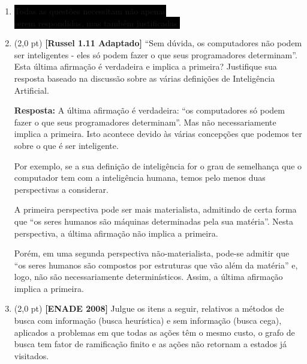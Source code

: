 \documentclass[12pt,a4paper,oneside]{article}
\begin{document}
\begin{enumerate}


	\item[] \colorbox{black}{
		\color{white}Todas as questões necessitam não apenas
	}\\ 
	\colorbox{black}{
		\color{white} serem respondidas, mas também justificadas.
	}

	\item (2,0 pt) {\bf [Russel 1.11 Adaptado]} ``Sem dúvida, os computadores não podem ser inteligentes - eles só podem fazer o que seus programadores determinam''. Esta última afirmação é verdadeira e implica a primeira? Justifique sua resposta baseado na discussão sobre as várias definições de Inteligência Artificial.
	
	\vspace*{0.3cm}
	
	{\color{blue} 
		{\bf Resposta:} A última afirmação é verdadeira: ``os computadores só podem fazer o que seus programadores determinam''. Mas não necessariamente implica a primeira. Isto acontece devido às várias concepções que podemos ter sobre o que é ser inteligente.
		
		Por exemplo, se a sua definição de inteligência for o grau de semelhança que o computador tem com a inteligência humana, temos pelo menos duas perspectivas a considerar. 
		
		A primeira perspectiva pode ser mais materialista, admitindo de certa forma que ``os seres humanos são máquinas determinadas pela sua matéria''. Nesta perspectiva, a última afirmação não implica a primeira.
		
		Porém, em uma segunda perspectiva não-materialista, pode-se admitir que ``os seres humanos são compostos por estruturas que vão além da matéria'' e, logo, não são necessariamente determinísticos. Assim, a última afirmação implica a primeira.
	}
			
	\item (2,0 pt) {\bf [ENADE 2008]} Julgue os itens a seguir, relativos a métodos de busca com informação (busca heurística) e sem informação (busca cega), aplicados a problemas em que todas as ações têm o mesmo custo, o grafo de busca tem fator de ramificação finito e as ações não retornam a estados já visitados.
	

\end{enumerate}
\end{document}
